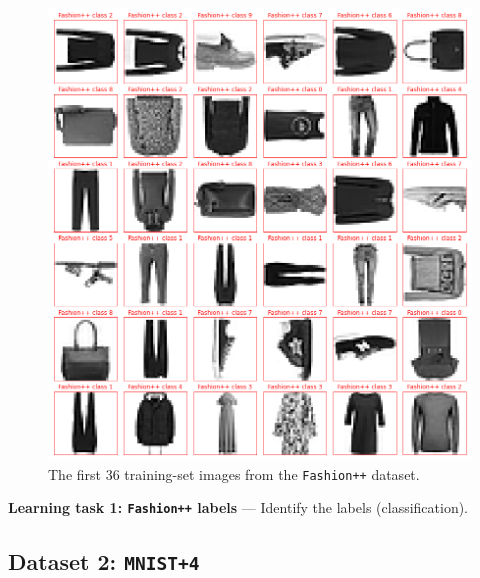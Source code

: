 \documentclass{article}
\renewcommand{\paragraph}[1]{\par\medskip\noindent\textbf{#1} ---}
\begin{document}
\begin{figure}[t!]
\includegraphics[width=\textwidth]{../notebooks/Fashion++.png}
\caption{The first 36 training-set images from the \texttt{Fashion++} dataset.\label{fig:f}}
\end{figure}

\paragraph{Learning task 1: \texttt{Fashion++} labels}
Identify the labels (classification).

\subsection*{Dataset 2: \texttt{MNIST+4}}
\end{document}
